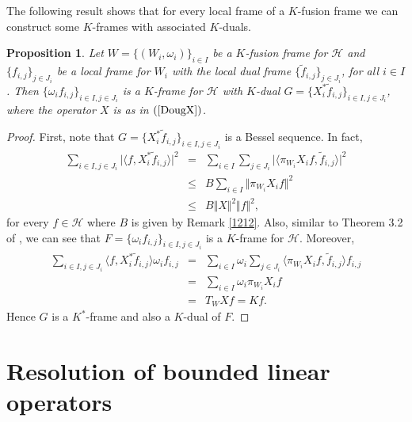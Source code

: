 \documentclass{birkjour}
\newtheorem{prop}[thm]{Proposition}
\theoremstyle{definition}
\theoremstyle{remark}
\numberwithin{equation}{section}
\begin{document}
The following result shows that for every  local frame of a $K$-fusion frame we can construct some  $K$-frames with associated $K$-duals.
\begin{prop}
Let $W = \lbrace (W_{i}, \omega_{i})\rbrace_{i\in I}$ be a
$K$-fusion frame for $\mathcal{H}$ and $\{f_{i,j}\}_{j\in J_{i}}$ be a local frame for $W_{i}$ with the local dual frame $\{\widetilde{f}_{i,j}\}_{j\in J_{i}}$, for all $i\in I$. Then $\{\omega_{i}f_{i,j}\}_{i\in I, j\in J_{i}}$ is a $K$-frame for $\mathcal{H}$ with $K$-dual $G = \{X_{i}^{*}\widetilde{f}_{i,j}\}_{i\in I, j\in J_{i}}$, where the operator $X$ is as in $(\ref{DougX})$.
\end{prop}
\begin{proof}
  First, note that $G = \{X_{i}^{*}\widetilde{f}_{i,j}\}_{i\in I, j\in J_{i}}$ is a Bessel sequence. In fact,
   \begin{eqnarray*}
\sum_{i\in I, j\in J_{i}}\vert \langle f, X_{i}^{*}\widetilde{f}_{i,j}\rangle\vert^{2}&=& \sum_{i\in I} \sum_{j\in J_{i}}\vert \langle \pi_{W_{i}}X_{i}f, \widetilde{f}_{i,j}\rangle\vert^{2}\\
&\leq& B  \sum_{i\in I}\Vert \pi_{W_{i}}X_{i}f\Vert^{2}\\
&\leq& B  \Vert X\Vert^{2}\Vert f\Vert^{2},
 \end{eqnarray*}
for every $f\in \mathcal{H}$  where $B$  is given by Remark \ref{1212}. Also, similar to Theorem 3.2 of \cite{Cas04}, we can see that $F = \{\omega_{i}f_{i,j}\}_{i\in I, j\in J_{i}}$ is a $K$-frame for $\mathcal{H}$. Moreover,
  \begin{eqnarray*}
\sum_{i\in I, j\in J_{i}} \langle f, X_{i}^{*}\widetilde{f}_{i,j}\rangle \omega_{i}f_{i,j}
&=& \sum_{i\in I}\omega_{i}\sum_{j\in J_{i}} \langle \pi_{W_{i}}X_{i}f, \widetilde{f}_{i,j}\rangle f_{i,j}\\
&=&  \sum_{i\in I}\omega_{i} \pi_{W_{i}}X_{i}f \\
&=& T_{W}Xf  = Kf.
 \end{eqnarray*}
Hence $G$ is a $K^{*}$-frame and also a
  $K$-dual of  $F$.
\end{proof}


\section{Resolution of  bounded linear operators}

\smallskip
\goodbreak
\end{document}
